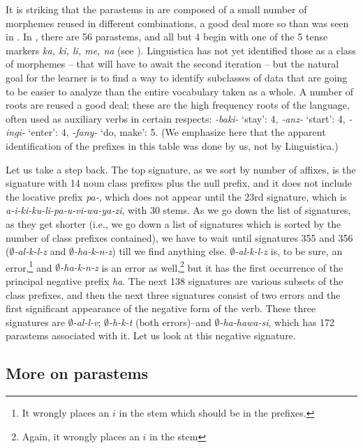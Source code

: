 \documentclass[output=paper,colorlinks,citecolor=brown]{langscibook}
\begin{document}
It is striking that the parastems in  are composed of a small number of morphemes reused in different combinations, a good deal more so than was seen in . In , there are 56 parastems, and all but 4 begin with one of the 5 tense markers \textit{ka, ki, li, me, na} (see ). Linguistica has not yet identified those as a class of morphemes -- that will have to await the second iteration -- but the natural goal for the learner is to find a way to identify subclasses of data that are going to be easier to analyze than the entire vocabulary taken as a whole.  A number of roots are reused a good deal; these are the high frequency roots of the language, often used as auxiliary verbs in certain respects: \textit{-baki-} `stay': 4, \textit{-anz-} `start': 4, \textit{-ingi-} `enter': 4, \textit{-fany-} `do, make': 5. (We emphasize here that the apparent identification of the prefixes in this table was done by us, not by Linguistica.) 


Let us take a step back. The top signature, as we sort by number of affixes, is the signature with 14 noun class prefixes plus the null prefix, and it does not include the locative prefix \textit{pa-}, which does not appear until the 23rd signature, which is \textit{a-i-ki-ku-li-pa-u-vi-wa-ya-zi}, with 30 stems.  As we go down the list of signatures, as they get shorter (i.e., we go down a list of signatures which is sorted by the number of class prefixes contained), we have to wait until signatures 355 and 356 (\textit{$\emptyset$-al-k-l-z} and \textit{$\emptyset$-ha-k-n-z}) till we find anything else. \textit{$\emptyset$-al-k-l-z} is, to be sure, an error,\footnote{It wrongly places an $i$ in the stem which should be in the prefixes.} and \textit{$\emptyset$-ha-k-n-z} is an error as well,\footnote{Again, it wrongly places an $i$ in the stem} but it has the first occurrence of the principal negative prefix \textit{ha}. The next 138 signatures are various subsets of the class prefixes, and then the next three signatures consist of two errors and the first significant appearance of the negative form of the verb. These three signatures are \textit{$\emptyset$-al-l-v}; \textit{$\emptyset$-h-k-t} (both errors)--and \textit{$\emptyset$-ha-hawa-si}, which has 172 parastems associated with it. Let us look at this negative signature.
 
\subsection{More on parastems}
\end{document}
